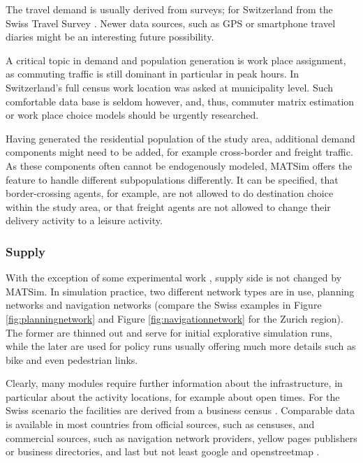 The travel demand is usually derived from surveys; for Switzerland from the Swiss Travel Survey \citep[][]{BfS-MZ2005_manual_2006}. Newer data sources, such as GPS or smartphone travel diaries might be an interesting future possibility.

A critical topic in demand and population generation is work place assignment, as commuting traffic is still dominant in particular in peak hours. In Switzerland's full census work location was asked at municipality level. Such comfortable data base is seldom however, and, thus, commuter matrix estimation or work place choice models should be urgently researched.

Having generated the residential population of the study area, additional demand components might need to be added, for example cross-border and freight traffic. As these components often cannot be endogenously modeled, MATSim offers the feature to handle different subpopulations differently. It can be specified, that border-crossing agents, for example, are not allowed to do destination choice within the study area, or that freight agents are not allowed to change their delivery activity to a leisure activity.

\subsubsection{Supply}
With the exception of some experimental work \citep[][]{HorniEtAl_TechRep_IVT_2012}, supply side is not changed by MATSim. In simulation practice, two different network types are in use, planning networks and navigation networks (compare the Swiss examples in Figure \ref{fig:planningnetwork} and Figure \ref{fig:navigationnetwork} for the Zurich region). The former are thinned out and serve for initial explorative simulation runs, while the later are used for policy runs usually offering much more details such as bike and even pedestrian links.

Clearly, many modules require further information about the infrastructure, in particular about the activity locations, for example about open times. For the Swiss scenario the facilities are derived from a business census \citep[][]{}. Comparable data is available in most countries from official sources, such as censuses, and commercial sources, such as navigation network providers, yellow pages publishers or business directories, and last but not least google and openstreetmap \citep[][]{OpenStreetMap_Webpage_2015}.

